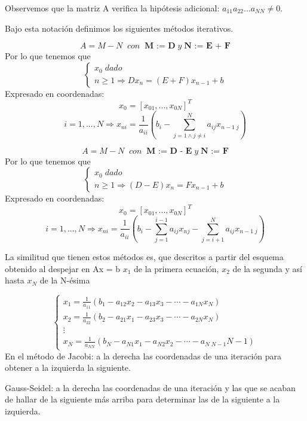 Observemos que la matriz A verifica la hipótesis adicional: $a_{11}a_{22}...a_{NN} \neq 0$.

Bajo esta notación definimos los siguientes métodos iterativos.

\begin{ndef}
\[ A = M - N \; \; con \; \; \textbf{M := D} \; y \; \textbf{N := E + F} \]
Por lo que tenemos que
\[ \left\{ \begin{array}{c}
x_0 \; dado \\
n \geq 1 \Rightarrow Dx_n = (E+F)x_{n-1} + b
\end{array}
\right. \]
Expresado en coordenadas:
\[
x_0 = \left[ x_{01},...,x_{0N} \right] ^T
\]
\[
i = 1,...,N \Rightarrow x_{ni} = \frac{1}{a_{ii}} \left( b_i - \sum_{j=1 \wedge j \neq i}^N a_{ij}x_{n-1 \; j} \right)
\]

\end{ndef}

\begin{ndef}
\[ A = M - N \; \; con \; \; \textbf{M := D - E} \; y \; \textbf{N := F} \]
Por lo que tenemos que
\[ \left\{ \begin{array}{c}
x_0 \; dado \\
n \geq 1 \Rightarrow (D-E)x_n = Fx_{n-1} + b
\end{array}
\right. \]
Expresado en coordenadas:
\[
x_0 = \left[ x_{01},...,x_{0N} \right] ^T
\]
\[
i = 1,...,N \Rightarrow x_{ni} = \frac{1}{a_{ii}} \left( b_i - \sum_{j=1}^{i-1} a_{ij}x_{nj} - \sum_{j=i+1}^N a_{ij}x_{n-1 \; j} \right)
\]
\end{ndef}

La similitud que tienen estos métodos es, que descritos a partir del esquema obtenido al despejar en Ax = b $x_1$ de la primera ecuación, $x_2$ de la segunda y así hasta $x_N$ de la N-ésima

\[ \left\{ \begin{array}{c}
x_1 = \frac{1}{a_{11}} (b_1 - a_{12}x_2 - a_{13}x_3 - \cdots - a_{1N}x_N) \\
x_2 = \frac{1}{a_{22}} (b_2 - a_{21}x_1 - a_{23}x_3 - \cdots - a_{2N}x_N) \\
\vdots \\
x_N = \frac{1}{a_{NN}} (b_N - a_{N1}x_1 - a_{N2}x_2 - \cdots - a_{N \; N-1}{N-1})
\end{array}
\right. \]
En el método de Jacobi: a la derecha las coordenadas de una iteración para obtener a la izquierda la siguiente.

Gauss-Seidel: a la derecha las coordenadas de una iteración y las que se acaban de hallar de la siguiente más arriba para determinar las de la siguiente a la izquierda.

